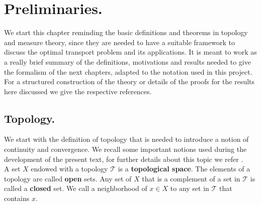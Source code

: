 \chapter{Preliminaries.}
We start this chapter reminding the basic definitions and theorems in topology and measure theory, since they are needed to have a suitable framework to discuss the optimal transport problem and its applications. It is meant to work as a really brief summary of the definitions, motivations and results needed to give the formalism of the next chapters, adapted to the notation used in this project. For a structured construction of the theory or details of the proofs for the results here discussed we give the respective references.


 

\section{Topology.}
We start with the definition of topology that is needed to introduce a notion of continuity and convergence. We recall some important notions used during the development of the present text, for further details about this topic we refer \cite{munkres2000topology}. 
\\

A set $X$ endowed with a topology $\mathcal{T}$ is a \textbf{topological space}. The elements of a topology are called \textbf{open} sets. Any set of $X$ that is a complement of a set in $\mathcal T$ is called a \textbf{closed} set. We call a neighborhood of $x\in X$ to any set in $\mathcal{T}$ that contains $x$.

